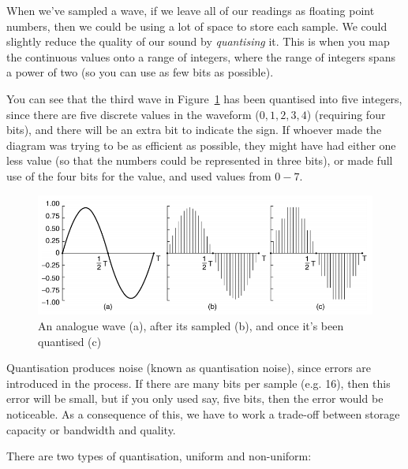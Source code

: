 When we've sampled a wave, if we leave all of our readings as floating point
numbers, then we could be using a lot of space to store each sample. We could
slightly reduce the quality of our sound by \textit{quantising} it. This is when
you map the continuous values onto a range of integers, where the range of
integers spans a power of two (so you can use as few bits as possible).

You can see that the third wave in Figure~\ref{quantised-wave} has been
quantised into five integers, since there are five discrete values in the
waveform ($0,1,2,3,4$) (requiring four bits), and there will be an extra bit to
indicate the sign. If whoever made the diagram was trying to be as efficient as
possible, they might have had either one less value (so that the numbers could
be represented in three bits), or made full use of the four bits for the value,
and used values from $0-7$.

\begin{figure}[H]
  \centering
  \includegraphics[width=\textwidth]{images/quantised-wave}
  \caption{An analogue wave (a), after its sampled (b), and once it's been quantised (c)}
  \label{quantised-wave}
\end{figure}

Quantisation produces noise (known as quantisation noise), since errors are
introduced in the process. If there are many bits per sample (e.g. 16), then
this error will be small, but if you only used say, five bits, then the error
would be noticeable. As a consequence of this, we have to work a trade-off
between storage capacity or bandwidth and quality.

There are two types of quantisation, uniform and non-uniform:

